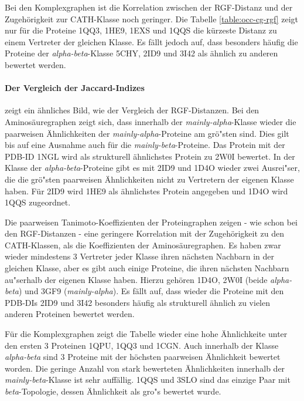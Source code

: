 \documentclass{report}
\begin{document}
Bei den Komplexgraphen ist die Korrelation zwischen der RGF-Distanz und der Zugeh\"origkeit zur CATH-Klasse noch geringer. Die Tabelle \ref{table:occ-cg-rgf} zeigt nur f\"ur die Proteine 1QQ3, 1HE9, 1EXS und 1QQS die k\"urzeste Distanz zu einem Vertreter der gleichen Klasse.
Es f\"allt jedoch auf, dass besonders h\"aufig die Proteine der \textit{alpha-beta}-Klasse 5CHY, 2ID9 und 3I42 als \"ahnlich zu anderen bewertet werden.

\paragraph{Der Vergleich der Jaccard-Indizes}
zeigt ein \"ahnliches Bild, wie der Vergleich der RGF-Distanzen. Bei den Aminos\"auregraphen zeigt sich, dass innerhalb der \textit{mainly-alpha}-Klasse wieder die paarweisen \"Ahnlichkeiten der \textit{mainly-alpha}-Proteine am gr\"o"sten sind. Dies gilt bis auf eine Ausnahme auch f\"ur die \textit{mainly-beta}-Proteine. Das Protein mit der PDB-ID 1NGL wird als strukturell \"ahnlichstes Protein zu 2W0I bewertet. In der Klasse der \textit{alpha-beta}-Proteine gibt es mit 2ID9 und 1D4O wieder zwei Ausrei"ser, die die gr\"o"sten paarweisen \"Ahnlichkeiten nicht zu Vertretern der eigenen Klasse haben. F\"ur 2ID9 wird 1HE9 als \"ahnlichstes Protein angegeben und 1D4O wird 1QQS zugeordnet.

Die paarweisen Tanimoto-Koeffizienten der Proteingraphen zeigen - wie schon bei den RGF-Distanzen - eine geringere Korrelation mit der Zugeh\"origkeit zu den CATH-Klassen, als die Koeffizienten der Aminos\"auregraphen. Es haben zwar wieder mindestens 3 Vertreter jeder Klasse ihren n\"achsten Nachbarn in der gleichen Klasse, aber es gibt auch einige Proteine, die ihren n\"achsten Nachbarn au"serhalb der eigenen Klasse haben. Hierzu geh\"oren 1D4O, 2W0I (beide \textit{alpha-beta}) und 3GF9 (\textit{mainly-alpha}). Es f\"allt auf, dass wieder die Proteine mit den PDB-DIs 2ID9 und 3I42 besonders h\"aufig als strukturell \"ahnlich zu vielen anderen Proteinen bewertet werden.

F\"ur die Komplexgraphen zeigt die Tabelle wieder eine hohe \"Ahnlichkeite unter den ersten 3 Proteinen 1QPU, 1QQ3 und 1CGN. Auch innerhalb der Klasse \textit{alpha-beta} sind 3 Proteine mit der h\"ochsten paarweisen \"Ahnlichkeit bewertet worden. Die geringe Anzahl von stark bewerteten \"Ahnlichkeiten innerhalb der \textit{mainly-beta}-Klasse ist sehr auff\"allig. 1QQS und 3SLO sind das einzige Paar mit \textit{beta}-Topologie, dessen \"Ahnlichkeit als gro"s bewertet wurde.
\end{document}

